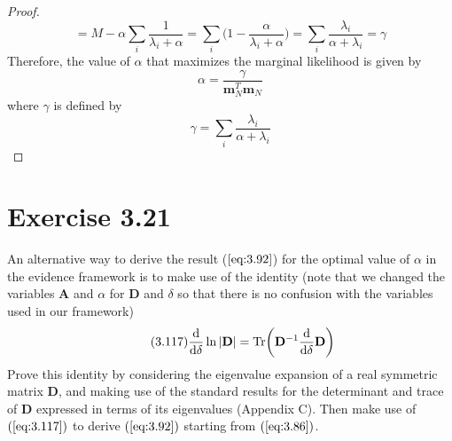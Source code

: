 \begin{proof}
\[        = M - \alpha \sum_i \frac{1}{\lambda_i + \alpha}
        = \sum_i \bigg(1 - \frac{\alpha}{\lambda_i + \alpha}\bigg)
        = \sum_i \frac{\lambda_i}{\alpha + \lambda_i}
        = \gamma
    \] 
    Therefore, the value of $\alpha$ that maximizes the marginal likelihood
    is given by 
    \begin{equation}\label{eq:3.92}\tag{3.92}
        \alpha = \frac{\gamma}{\mathbf{m}_N^T\mathbf{m}_N}
    \end{equation}
    where $\gamma$ is defined by
    \begin{equation}\label{eq:3.91}\tag{3.91}
        \gamma = \sum_i \frac{\lambda_i}{\alpha + \lambda_i}
    \end{equation}
\end{proof}

\section*{Exercise 3.21}
An alternative way to derive the result ($\ref{eq:3.92}$) for the optimal
value of $\alpha$ in the evidence framework is to make use of the identity
(note that we changed the variables $\mathbf{A}$ and $\alpha$ for $\mathbf{D}$ and
$\delta$ so that there is no confusion with the variables used in our 
framework)
\begin{equation}\label{eq:3.117}\tag{3.117}
    \dv{\delta} \ln |\mathbf{D}| = \text{Tr}\bigg(\mathbf{D}^{-1}\dv{\delta}\mathbf{D}\bigg)
\end{equation}
Prove this identity by considering the eigenvalue expansion of a real
symmetric matrix $\mathbf{D}$, and making use of the standard results
for the determinant and trace of $\mathbf{D}$ expressed in terms of 
its eigenvalues (Appendix C). Then make use of $(\ref{eq:3.117})$ to
derive $(\ref{eq:3.92})$ starting from $(\ref{eq:3.86})$.

\vspace{1em}

